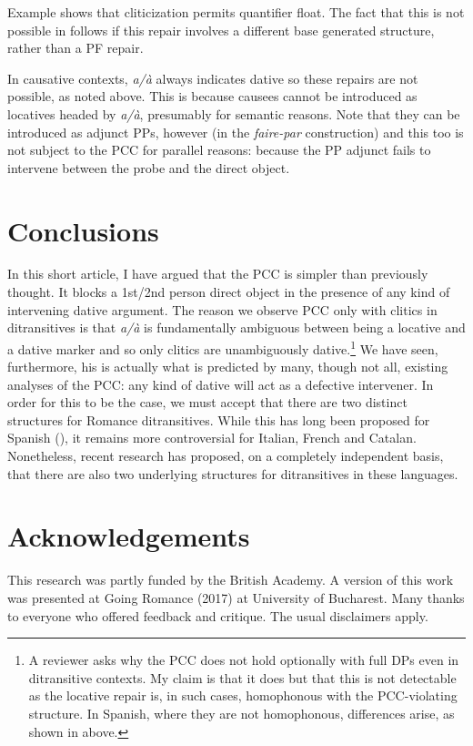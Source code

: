 \documentclass[output=paper,colorlinks,citecolor=brown,nonflat]{./langscibook}
\begin{document}
Example  shows that cliticization permits quantifier float. The fact that this is not possible in  follows if this repair involves a different base generated structure, rather than a PF repair. 

In causative contexts, \textit{a/à} always indicates dative so these repairs are not possible, as noted above. This is because causees cannot be introduced as locatives headed by \textit{a/à}, presumably for semantic reasons. Note that they can be introduced as adjunct PPs, however (in the \textit{faire-par} construction) and this too is not subject to the PCC for parallel reasons: because the PP adjunct fails to intervene between the probe and the direct object. 

\section{Conclusions}\label{sec:sheehan:6}

In this short article, I have argued that the PCC is simpler than previously thought. It blocks a 1st/2nd person direct object in the presence of any kind of intervening dative argument. The reason we observe PCC only with clitics in ditransitives is that \textit{a/à} is fundamentally ambiguous between being a locative and a dative marker and so only clitics are unambiguously dative.\footnote{A reviewer asks why the PCC does not hold optionally with full DPs even in ditransitive contexts. My claim is that it does but that this is not detectable as the locative repair is, in such cases, homophonous with the PCC-violating structure. In Spanish, where they are not homophonous, differences arise, as shown in  above.} We have seen, furthermore, his is actually what is predicted by many, though not all, existing analyses of the PCC: any kind of dative will act as a defective intervener. In order for this to be the case, we must accept that there are two distinct structures for Romance ditransitives. While this has long been proposed for Spanish (\citealt{Demonte1995, Cuervo2003}), it remains more controversial for Italian, French and Catalan. Nonetheless, recent research has proposed, on a completely independent basis, that there are also two underlying structures for ditransitives in these languages. 

\section*{Acknowledgements}

This research was partly funded by the British Academy. A version of this work was presented at Going Romance (2017) at University of Bucharest. Many thanks to everyone who offered feedback and critique. The usual disclaimers apply. 

\sloppy\printbibliography[heading=subbibliography,notkeyword=this]
\end{document}
